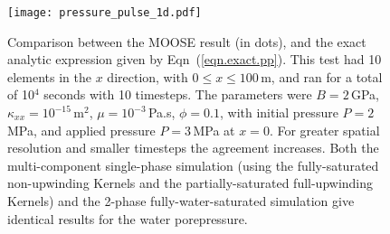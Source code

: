 \documentclass[]{scrreprt}
\begin{document}
\begin{figure}[htb]
\centering
\texttt{[image: pressure\_pulse\_1d.pdf]}
\caption{Comparison between the MOOSE result (in dots), and the exact
  analytic expression given by Eqn~(\ref{eqn.exact.pp}).  This test
  had 10 elements in the $x$ direction, with $0\leq x \leq 100$\,m,
  and ran for a total of 10$^4$ seconds with 10 timesteps.  The
  parameters were $B=2$\,GPa, $\kappa_{xx}=10^{-15}$\,m$^{2}$,
  $\mu=10^{-3}$\,Pa.s, $\phi=0.1$, with initial pressure $P=2$\,MPa,
  and applied pressure $P=3$\,MPa at $x=0$.  For greater spatial
  resolution and smaller timesteps the agreement increases.  Both the
  multi-component single-phase simulation (using the fully-saturated
  non-upwinding Kernels and the partially-saturated full-upwinding
  Kernels) and the 2-phase fully-water-saturated simulation give
  identical results for the water porepressure.}
\label{pressure_pulse.fig}
\end{figure}
\end{document}
